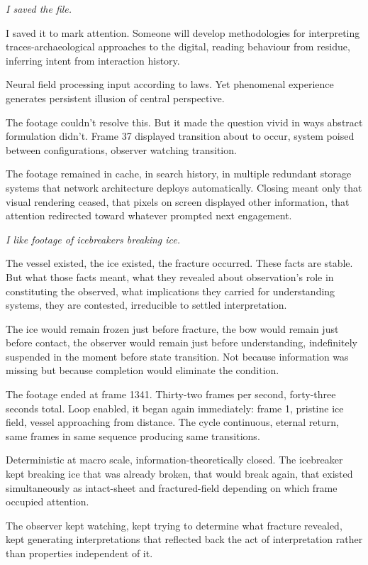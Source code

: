 \textit{I saved the file.}

I saved it to mark attention. Someone will develop methodologies for interpreting traces-archaeological approaches to the digital, reading behaviour from residue, inferring intent from interaction history.

Neural field processing input according to laws. Yet phenomenal experience generates persistent illusion of central perspective.

The footage couldn't resolve this. But it made the question vivid in ways abstract formulation didn't. Frame 37 displayed transition about to occur, system poised between configurations, observer watching transition.


The footage remained in cache, in search history, in multiple redundant storage systems that network architecture deploys automatically. Closing meant only that visual rendering ceased, that pixels on screen displayed other information, that attention redirected toward whatever prompted next engagement.

\textit{I like footage of icebreakers breaking ice.}

The vessel existed, the ice existed, the fracture occurred. These facts are stable. But what those facts meant, what they revealed about observation's role in constituting the observed, what implications they carried for understanding systems, they are contested, irreducible to settled interpretation.

The ice would remain frozen just before fracture, the bow would remain just before contact, the observer would remain just before understanding, indefinitely suspended in the moment before state transition. Not because information was missing but because completion would eliminate the condition.

The footage ended at frame 1341. Thirty-two frames per second, forty-three seconds total. Loop enabled, it began again immediately: frame 1, pristine ice field, vessel approaching from distance. The cycle continuous, eternal return, same frames in same sequence producing same transitions. 

Deterministic at macro scale, information-theoretically closed. The icebreaker kept breaking ice that was already broken, that would break again, that existed simultaneously as intact-sheet and fractured-field depending on which frame occupied attention. 

The observer kept watching, kept trying to determine what fracture revealed, kept generating interpretations that reflected back the act of interpretation rather than properties independent of it.

